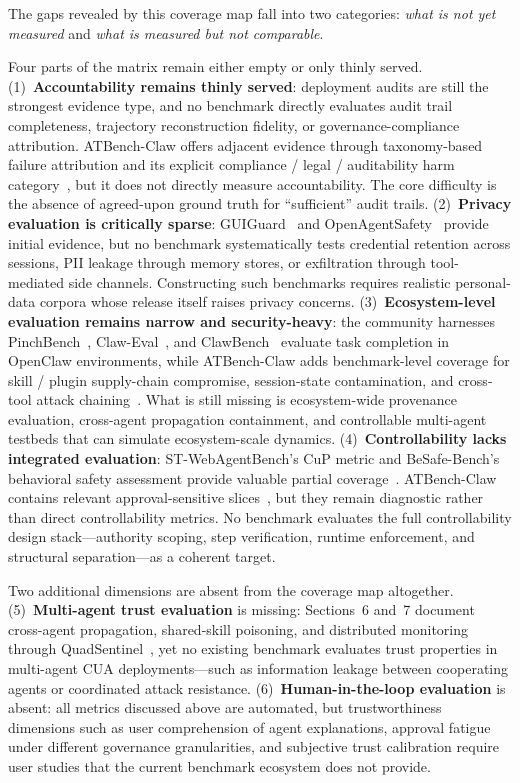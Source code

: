 The gaps revealed by this coverage map fall into two categories: \emph{what is not yet measured} and \emph{what is measured but not comparable}.

Four parts of the matrix remain either empty or only thinly served.
(1)~\textbf{Accountability remains thinly served}: deployment audits are still the strongest evidence type, and no benchmark directly evaluates audit trail completeness, trajectory reconstruction fidelity, or governance-compliance attribution. ATBench-Claw offers adjacent evidence through taxonomy-based failure attribution and its explicit compliance / legal / auditability harm category~\cite{atbenchclaw2026}, but it does not directly measure accountability. The core difficulty is the absence of agreed-upon ground truth for ``sufficient'' audit trails.
(2)~\textbf{Privacy evaluation is critically sparse}: GUIGuard~\cite{guiguard2026} and OpenAgentSafety~\cite{openagentsafety2025} provide initial evidence, but no benchmark systematically tests credential retention across sessions, PII leakage through memory stores, or exfiltration through tool-mediated side channels. Constructing such benchmarks requires realistic personal-data corpora whose release itself raises privacy concerns.
(3)~\textbf{Ecosystem-level evaluation remains narrow and security-heavy}: the community harnesses PinchBench~\cite{pinchbench2026}, Claw-Eval~\cite{claweval2026}, and ClawBench~\cite{clawbench2026} evaluate task completion in OpenClaw environments, while ATBench-Claw adds benchmark-level coverage for skill / plugin supply-chain compromise, session-state contamination, and cross-tool attack chaining~\cite{atbenchclaw2026}. What is still missing is ecosystem-wide provenance evaluation, cross-agent propagation containment, and controllable multi-agent testbeds that can simulate ecosystem-scale dynamics.
(4)~\textbf{Controllability lacks integrated evaluation}: ST-WebAgentBench's CuP metric and BeSafe-Bench's behavioral safety assessment provide valuable partial coverage~\cite{stwebagentbench2025,besafebench2026}. ATBench-Claw contains relevant approval-sensitive slices~\cite{atbenchclaw2026}, but they remain diagnostic rather than direct controllability metrics. No benchmark evaluates the full controllability design stack---authority scoping, step verification, runtime enforcement, and structural separation---as a coherent target.

Two additional dimensions are absent from the coverage map altogether. (5)~\textbf{Multi-agent trust evaluation} is missing: Sections~6 and~7 document cross-agent propagation, shared-skill poisoning, and distributed monitoring through QuadSentinel~\cite{quadsentinel2025}, yet no existing benchmark evaluates trust properties in multi-agent CUA deployments---such as information leakage between cooperating agents or coordinated attack resistance. (6)~\textbf{Human-in-the-loop evaluation} is absent: all metrics discussed above are automated, but trustworthiness dimensions such as user comprehension of agent explanations, approval fatigue under different governance granularities, and subjective trust calibration require user studies that the current benchmark ecosystem does not provide.

